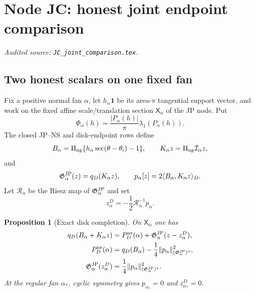 \documentclass[11pt]{amsart}
\numberwithin{equation}{section}
\newtheorem{proposition}[theorem]{Proposition}
\theoremstyle{definition}
\theoremstyle{remark}
\newcommand{\Gjp}{\mathfrak G^{\rm JP}}
\begin{document}
\begingroup
\section{Node JC: honest joint endpoint comparison}
\label{module:JC}
\noindent\textit{Audited source: \nolinkurl{JC_joint_comparison.tex}.}
\subsection{Two honest scalars on one fixed fan}

Fix a positive normal fan $\alpha$, let $h_\alpha\mathbf1$ be its
area-$\pi$ tangential support vector, and work on the fixed affine
scale/translation section $\mathsf X_\alpha$ of the JP node.  Put
\begin{equation}\label{JC:eq:polygon-scalar}
 \Phi_\alpha(h)=\frac{|P_\alpha(h)|}{\pi}
                    \lambda_1(P_\alpha(h)).
\end{equation}
The closed JP--NS and disk-endpoint rows define
\begin{equation}\label{JC:eq:disk-data}
 B_\alpha=\Pi_{\rm ng}
 \{h_\alpha\sec(\theta-\theta_i)-1\},\qquad
 K_\alpha z=\Pi_{\rm ng}\mathcal I_\alpha z,
\end{equation}
and
\begin{equation}\label{JC:eq:metric-forcing}
 \Gjp_\alpha(z)=q_D(K_\alpha z),\qquad
 p_\alpha[z]=2\langle B_\alpha,K_\alpha z\rangle_D.
\end{equation}
Let $\mathcal R_\alpha$ be the Riesz map of $\Gjp_\alpha$ and set
\begin{equation}\label{JC:eq:disk-corrector}
 z_\alpha^D=-\frac12\mathcal R_\alpha^{-1}p_\alpha.
\end{equation}

\begin{proposition}[Exact disk completion]\label{JC:prop:disk-completion}
On $\mathsf X_\alpha$ one has
\begin{align}
 q_D(B_\alpha+K_\alpha z)
 &=P_D^{\rm ns}(\alpha)
   +\Gjp_\alpha(z-z_\alpha^D),\label{JC:eq:disk-completion}\\
 P_D^{\rm ns}(\alpha)
 &=q_D(B_\alpha)-\frac14
       \|p_\alpha\|_{(\Gjp_\alpha)^*}^2,\label{JC:eq:disk-schur}\\
 \Gjp_\alpha(z_\alpha^D)
 &=\frac14\|p_\alpha\|_{(\Gjp_\alpha)^*}^2.
 \label{JC:eq:corrector-size}
\end{align}
At the regular fan $\alpha_*$, cyclic symmetry gives
$p_{\alpha_*}=0$ and $z_{\alpha_*}^D=0$.
\end{proposition}
\end{document}
